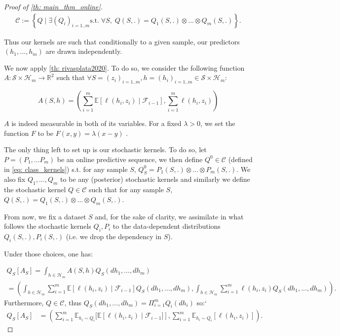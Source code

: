 \begin{noaddcontents}
\begin{proof}[Proof of \cref{th: main_thm_online}]
\begin{align}
  \label{eq: class_kernels}
  \mathcal{C}:= \left\{ Q \mid   \exists (Q_i)_{i=1..m}\text{s.t.}\; \forall S,\;  Q(S,.) = Q_1(S,.)\otimes...\otimes Q_m(S,.)      \right\}.
\end{align}


\noindent Thus our kernels are such that conditionally to a given sample, our predictors $(h_1,...,h_m)$ are drawn independently.

\noindent We now apply \cref{th: rivasplata2020}. To do so, we consider the following function $A: \mathcal{S}\times \mathcal{H}_m \rightarrow \mathbb{R}^2$ such that $\forall S= (z_i)_{i=1..m},h= (h_i)_{i=1..m}\in \mathcal{S}\times \mathcal{H}_m$:

\[  A(S,h)= \left(\sum_{i=1}^m \mathbb{E}[\ell(h_i,z_i)\mid \mathcal{F}_{i-1}], \sum_{i=1}^m \ell(h_i,z_i)  \right)   \]

\noindent $A$ is indeed measurable in both of its variables. For a fixed $\lambda>0$, we set the function $F$ to be $F(x,y)= \lambda(x-y)$ .


 \noindent The only thing left to set up is our stochastic kernels. To do so, let $P=(P_1,...P_m)$ be an online predictive sequence, we then define $Q^0\in\mathcal{C}$ (defined in \cref{eq: class_kernels}) s.t. for any sample $S$, $Q^0_S = P_1(S,.)\otimes...\otimes P_m(S,.)$. We also fix $Q_1,...,Q_m$ to be any (posterior)
 stochastic kernels and similarly we define the stochastic kernel $Q\in\mathcal{C}$ such that for any sample $S$, $Q(S,.) = Q_1(S,.)\otimes...\otimes Q_m(S,.)$.

 From now, we fix a dataset $S$ and, for the sake of clarity, we assimilate in what follows the stochastic kernels $Q_i,P_i$ to the data-dependent distributions $Q_i(S,.), P_i(S,.)$ (i.e. we drop the dependency in $S$).

\noindent Under those choices, one has:

\begin{multline*}
  Q_S[A_S]  = \int_{h\in\mathcal{H}_m} A(S,h) Q_S(dh_1,...,dh_m) \\
     = \left( \int_{h\in\mathcal{H}_m} \sum_{i=1}^m \mathbb{E}[\ell(h_i,z_i)\mid \mathcal{F}_{i-1}]Q_S(dh_1,...,dh_m), \int_{h\in\mathcal{H}_m}\sum_{i=1}^m \ell(h_i,z_i)  Q_S(dh_1,...,dh_m)    \right).
\end{multline*}
Furthermore, $Q\in\mathcal{C}$, thus $Q_S(dh_1,...,dh_m)= \Pi_{i=1}^m Q_i(dh_i)$ so:`
\begin{align*}
  Q_S[A_S] &= \left(  \sum_{i=1}^m \mathbb{E}_{h_i\sim Q_i}[\mathbb{E}\left[\ell(h_i,z_i)\mid \mathcal{F}_{i-1}]\right], \sum_{i=1}^m \mathbb{E}_{h_i\sim Q_i}[\ell(h_i,z_i)]       \right).
\end{align*}


\end{proof}
\end{noaddcontents}
